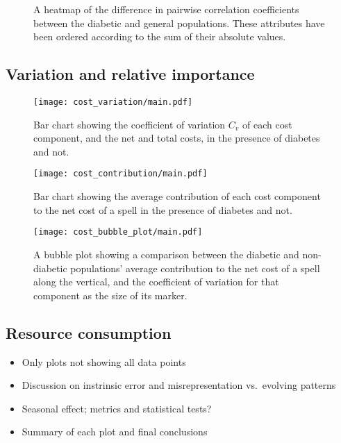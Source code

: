 \begin{figure}[htbp]
    \caption{A heatmap of the difference in pairwise correlation coefficients
        between the diabetic and general populations. These attributes have been
        ordered according to the sum of their absolute values.}%
    \label{fig:diabetes_corr_difference}
\end{figure}


\subsection{Variation and relative importance}\label{subsec:diabetes_variation}

\begin{figure}[h]
    \centering
    \texttt{[image: cost\_variation/main.pdf]}
    \caption{Bar chart showing the coefficient of variation \(C_{v}\) of each
        cost component, and the net and total costs, in the presence of diabetes
        and not.}%
    \label{fig:diabetes_variation}
\end{figure}

\begin{figure}[h]
    \centering
    \texttt{[image: cost\_contribution/main.pdf]}
    \caption{Bar chart showing the average contribution of each cost component
        to the net cost of a spell in the presence of diabetes and not.}%
    \label{fig:cost_contribution}
\end{figure}

\begin{figure}[h]
    \hspace{-75pt}
    \texttt{[image: cost\_bubble\_plot/main.pdf]}\hfill%
    \caption{A bubble plot showing a comparison between the diabetic and
        non-diabetic populations' average contribution to the net cost of a
        spell along the vertical, and the coefficient of variation for that
        component as the size of its marker.}%
    \label{fig:cost_bubble_plot}
\end{figure}

\subsection{Resource consumption}\label{subsec:diabetes_resources}

\begin{itemize}
    \item Only plots not showing all data points
    \item Discussion on instrinsic error and misrepresentation vs.\ evolving
        patterns
    \item Seasonal effect; metrics and statistical tests?
    \item Summary of each plot and final conclusions
\end{itemize}

